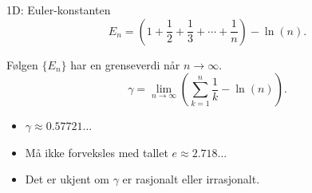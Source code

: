 \redheader
\begin{frame}{1D: Euler-konstanten}
\[
E_n = \left(1 + \frac{1}{2} + \frac{1}{3} + \cdots + \frac{1}{n}\right) - \ln(n).
\]

\medskip
Følgen $\{E_n\}$ har en grenseverdi når $n \to \infty$.\\
\[
\gamma = \lim_{n \to \infty} \left( \sum_{k=1}^n \frac{1}{k} - \ln(n) \right).
\]

\medskip
\begin{itemize}
  \item $\gamma \approx 0.57721\ldots$\\
  \item Må ikke forveksles med tallet $e \approx 2.718\ldots$\\
  \item Det er ukjent om $\gamma$ er rasjonalt eller irrasjonalt.\\
\end{itemize}
\end{frame}


